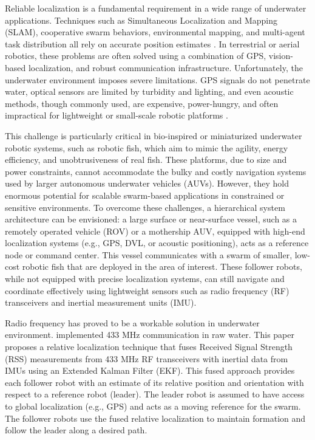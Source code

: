 \documentclass{ifacconf}
\begin{document}
Reliable localization is a fundamental requirement in a wide range of underwater applications. Techniques such as Simultaneous Localization and Mapping (SLAM), cooperative swarm behaviors, environmental mapping, and multi-agent task distribution all rely on accurate position estimates \citep{Köser2020}. In terrestrial or aerial robotics, these problems are often solved using a combination of GPS, vision-based localization, and robust communication infrastructure. Unfortunately, the underwater environment imposes severe limitations. GPS signals do not penetrate water, optical sensors are limited by turbidity and lighting, and even acoustic methods, though commonly used, are expensive, power-hungry, and often impractical for lightweight or small-scale robotic platforms \citep{Connor2021}.

This challenge is particularly critical in bio-inspired or miniaturized underwater robotic systems, such as robotic fish, which aim to mimic the agility, energy efficiency, and unobtrusiveness of real fish. These platforms, due to size and power constraints, cannot accommodate the bulky and costly navigation systems used by larger autonomous underwater vehicles (AUVs). However, they hold enormous potential for scalable swarm-based applications in constrained or sensitive environments.
To overcome these challenges, a hierarchical system architecture can be envisioned: a large surface or near-surface vessel, such as a remotely operated vehicle (ROV) or a mothership AUV, equipped with high-end localization systems (e.g., GPS, DVL, or acoustic positioning), acts as a reference node or command center. This vessel communicates with a swarm of smaller, low-cost robotic fish that are deployed in the area of interest. These follower robots, while not equipped with precise localization systems, can still navigate and coordinate effectively using lightweight sensors such as radio frequency (RF) transceivers and inertial measurement units (IMU).

Radio frequency has proved to be a workable solution in underwater environment. \cite{Ryecroft2019} implemented 433 MHz communication in raw water. This paper proposes a relative localization technique that fuses Received Signal Strength (RSS) measurements from 433 MHz RF transceivers with inertial data from IMUs using an Extended Kalman Filter (EKF). This fused approach provides each follower robot with an estimate of its relative position and orientation with respect to a reference robot (leader). The leader robot is assumed to have access to global localization (e.g., GPS) and acts as a moving reference for the swarm. The follower robots use the fused relative localization to maintain formation and follow the leader along a desired path.
\end{document}
